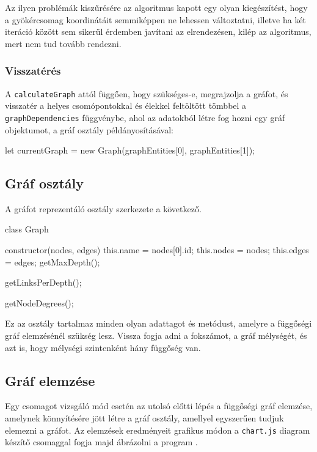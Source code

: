Az ilyen problémák kiszűrésére az algoritmus kapott egy olyan kiegészítést, hogy a gyökércsomag koordinátáit semmiképpen ne lehessen változtatni, illetve ha két iteráció között sem sikerül érdemben javítani az elrendezésen, kilép az algoritmus, mert nem tud tovább rendezni.\\

\subsubsection{Visszatérés}

A \texttt{calculateGraph} attól függően, hogy szükséges-e, megrajzolja a gráfot, és visszatér a helyes csomópontokkal és élekkel feltöltött tömbbel a \texttt{graphDependencies} függvénybe, ahol az adatokból létre fog hozni egy gráf objektumot, a gráf osztály példányosításával:

\begin{js}
let currentGraph = new Graph(graphEntities[0], graphEntities[1]);
\end{js}

\pagebreak

\subsection{Gráf osztály}

A gráfot reprezentáló osztály szerkezete a következő.

\begin{js}
class Graph {
  constructor(nodes, edges){
    this.name = nodes[0].id;
    this.nodes = nodes;
    this.edges = edges;
  }
  getMaxDepth();

  getLinksPerDepth();

  getNodeDegrees();
}
\end{js}

Ez az osztály tartalmaz minden olyan adattagot és metódust, amelyre a függőségi gráf elemzésénél szükség lesz. Vissza fogja adni a fokszámot, a gráf mélységét, és azt is, hogy mélységi szintenként hány függőség van.

\subsection{Gráf elemzése}

Egy csomagot vizsgáló mód esetén az utolsó előtti lépés a függőségi gráf elemzése, amelynek könnyítésére jött létre a gráf osztály, amellyel egyszerűen tudjuk elemezni a gráfot. Az elemzések eredményeit grafikus módon a \texttt{chart.js} diagram készítő csomaggal fogja majd ábrázolni a program \cite{chart}.

